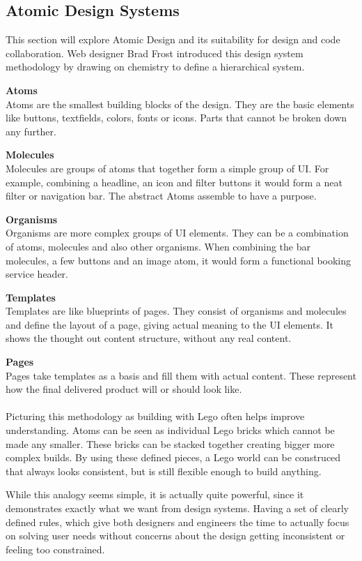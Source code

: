 \newpage
\subsection{Atomic Design Systems} \label{Atomic Design Systems}
This section will explore Atomic Design and its suitability for design and code collaboration. Web
designer Brad Frost introduced this design system methodology by drawing on chemistry to define a
hierarchical system.

\textbf{Atoms} \\
Atoms are the smallest building blocks of the design. They are the basic elements like buttons,
textfields, colors, fonts or icons. Parts that cannot be broken down any further.

\textbf{Molecules} \\
Molecules are groups of atoms that together form a simple group of UI. For example, combining
a headline, an icon and filter buttons it would form a neat filter or navigation bar. The
abstract Atoms assemble to have a purpose.

\textbf{Organisms} \\
Organisms are more complex groups of UI elements. They can be a combination of atoms, molecules and
also other organisms. When combining the bar molecules, a few buttons and an image atom, it would
form a functional booking service header.

\textbf{Templates} \\
Templates are like blueprints of pages. They consist of organisms and molecules and define the
layout of a page, giving actual meaning to the UI elements. It shows the thought out content
structure, without any real content.

\textbf{Pages}\\
Pages take templates as a basis and fill them with actual content. These represent how the final
delivered product will or should look like. \\
\\

Picturing this methodology as building with Lego often helps improve understanding. Atoms can be
seen as individual Lego bricks which cannot be made any smaller. These bricks can be stacked
together creating bigger more complex builds. By using these defined pieces, a Lego world can be
construced that always looks consistent, but is still flexible enough to build anything.

While this analogy seems simple, it is actually quite powerful, since it demonstrates exactly what
we want from design systems. Having a set of clearly defined rules, which give both designers and
engineers the time to actually focus on solving user needs without concerns about the design
getting inconsistent or feeling too constrained. 

